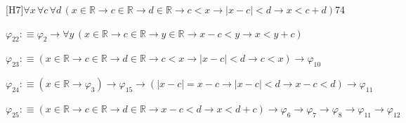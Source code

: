 \begin{fullproof}{[H7]}{$\forall x\,\forall c\,\forall d\,(x \in \mathbb{R} \to c \in \mathbb{R} \to d \in \mathbb{R} \to c < x \to \lvert x - c \rvert < d \to x < c + d)$}{74}
\begin{abbrevlist}
\item $\varphi_{22} :\equiv \varphi_{2} \to \forall y\,(x \in \mathbb{R} \to c \in \mathbb{R} \to y \in \mathbb{R} \to x - c < y \to x < y + c)$
\item $\varphi_{23} :\equiv (x \in \mathbb{R} \to c \in \mathbb{R} \to d \in \mathbb{R} \to c < x \to \lvert x - c \rvert < d \to c < x) \to \varphi_{10}$
\item $\varphi_{24} :\equiv (x \in \mathbb{R} \to \varphi_{3}) \to \varphi_{15} \to (\lvert x - c \rvert = x - c \to \lvert x - c \rvert < d \to x - c < d) \to \varphi_{11}$
\item $\varphi_{25} :\equiv (x \in \mathbb{R} \to c \in \mathbb{R} \to d \in \mathbb{R} \to x - c < d \to x < d + c) \to \varphi_{6} \to \varphi_{7} \to \varphi_{8} \to \varphi_{11} \to \varphi_{12}$
\end{abbrevlist}
\end{fullproof}
